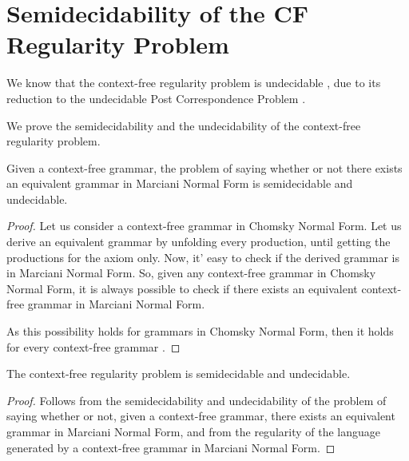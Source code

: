 \section{Semidecidability of the CF Regularity Problem}
\label{sec:semidecidability}

We know that the context-free regularity problem is undecidable
\cite{Pettorossi13}, due to its reduction to the undecidable Post Correspondence
Problem \cite{Hopcroft06}.

We prove the semidecidability and the undecidability of the context-free
regularity problem.

\begin{theorem}
	\label{thm:semidecidability-mnf}
	Given a context-free grammar, the problem of saying whether or not there
	exists an equivalent grammar in Marciani Normal Form is semidecidable and
	undecidable.

	\begin{proof}
		Let us consider a context-free grammar in Chomsky Normal Form.
		Let us derive an equivalent grammar by unfolding every production,
		until getting the productions for the axiom only.
		Now, it' easy to check if the derived grammar is in Marciani Normal Form.
		So, given any context-free grammar in Chomsky Normal Form, it is always
		possible to check if there exists an equivalent context-free grammar in
		Marciani Normal Form.

		As this possibility holds for grammars in Chomsky Normal Form, then it
		holds for every context-free grammar \cite{Pettorossi13}.
	\end{proof}
\end{theorem}

\begin{theorem}
	\label{thm:semidecidability}
	The context-free regularity problem is semidecidable and undecidable.

	\begin{proof}
		Follows from the semidecidability and undecidability of the problem of
		saying whether or not, given a context-free grammar, there exists an
		equivalent grammar in Marciani Normal Form, and from the regularity of
		the language generated by a context-free grammar in Marciani Normal Form.
	\end{proof}
\end{theorem}
